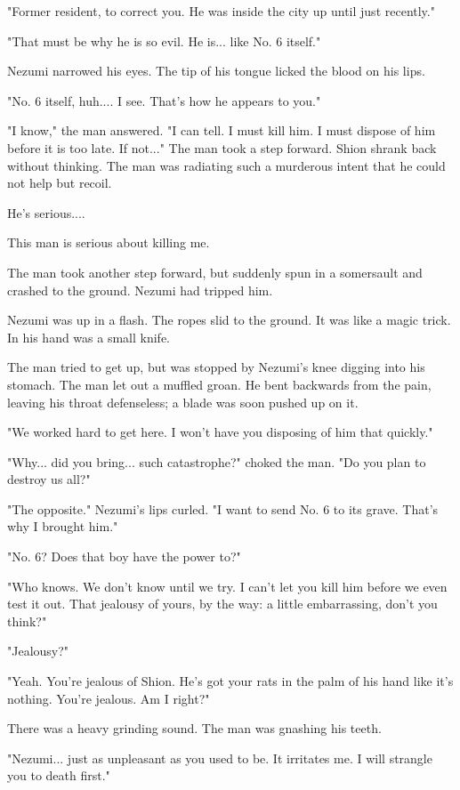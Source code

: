 "Former resident, to correct you. He was inside the city up until just
recently."

"That must be why he is so evil. He is... like No. 6 itself."

Nezumi narrowed his eyes. The tip of his tongue licked the blood on his
lips.

"No. 6 itself, huh.... I see. That's how he appears to you."

"I know," the man answered. "I can tell. I must kill him. I must dispose
of him before it is too late. If not..." The man took a step forward.
Shion shrank back without thinking. The man was radiating such a
murderous intent that he could not help but recoil.

He's serious....

This man is serious about killing me.

The man took another step forward, but suddenly spun in a somersault and
crashed to the ground. Nezumi had tripped him.

Nezumi was up in a flash. The ropes slid to the ground. It was like a
magic trick. In his hand was a small knife.

The man tried to get up, but was stopped by Nezumi's knee digging into
his stomach. The man let out a muffled groan. He bent backwards from the
pain, leaving his throat defenseless; a blade was soon pushed up on it.

"We worked hard to get here. I won't have you disposing of him that
quickly."

"Why... did you bring... such catastrophe?" choked the man. "Do you plan
to destroy us all?"

"The opposite." Nezumi's lips curled. "I want to send No. 6 to its
grave. That's why I brought him."

"No. 6? Does that boy have the power to?"

"Who knows. We don't know until we try. I can't let you kill him before
we even test it out. That jealousy of yours, by the way: a little
embarrassing, don't you think?"

"Jealousy?"

"Yeah. You're jealous of Shion. He's got your rats in the palm of his
hand like it's nothing. You're jealous. Am I right?"

There was a heavy grinding sound. The man was gnashing his teeth.

"Nezumi... just as unpleasant as you used to be. It irritates me. I will
strangle you to death first."


